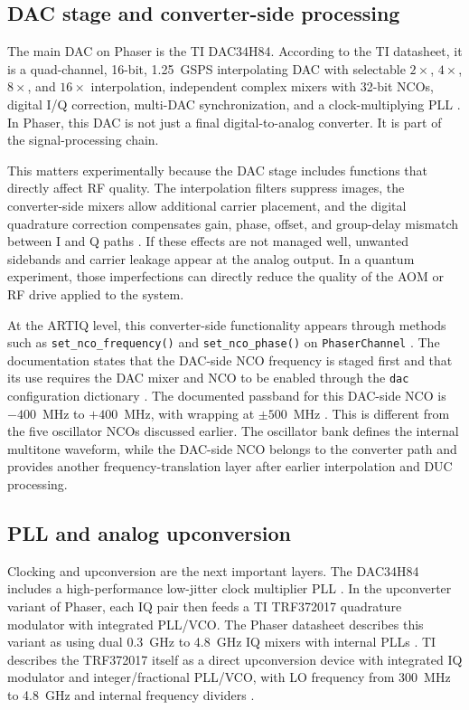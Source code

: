 \subsection{DAC stage and converter-side processing}

The main DAC on Phaser is the TI DAC34H84. According to the TI datasheet, it is a quad-channel, 16-bit, 1.25~GSPS interpolating DAC with selectable \(2\times\), \(4\times\), \(8\times\), and \(16\times\) interpolation, independent complex mixers with 32-bit NCOs, digital I/Q correction, multi-DAC synchronization, and a clock-multiplying PLL \cite{dac34h84}. In Phaser, this DAC is not just a final digital-to-analog converter. It is part of the signal-processing chain.

This matters experimentally because the DAC stage includes functions that directly affect RF quality. The interpolation filters suppress images, the converter-side mixers allow additional carrier placement, and the digital quadrature correction compensates gain, phase, offset, and group-delay mismatch between I and Q paths \cite{dac34h84}. If these effects are not managed well, unwanted sidebands and carrier leakage appear at the analog output. In a quantum experiment, those imperfections can directly reduce the quality of the AOM or RF drive applied to the system.

At the ARTIQ level, this converter-side functionality appears through methods such as \texttt{set\_nco\_frequency()} and \texttt{set\_nco\_phase()} on \texttt{PhaserChannel} \cite{artiq_coredrivers}. The documentation states that the DAC-side NCO frequency is staged first and that its use requires the DAC mixer and NCO to be enabled through the \texttt{dac} configuration dictionary \cite{artiq_coredrivers}. The documented passband for this DAC-side NCO is \(-400\)~MHz to \(+400\)~MHz, with wrapping at \(\pm 500\)~MHz \cite{artiq_coredrivers}. This is different from the five oscillator NCOs discussed earlier. The oscillator bank defines the internal multitone waveform, while the DAC-side NCO belongs to the converter path and provides another frequency-translation layer after earlier interpolation and DUC processing.

\subsection{PLL and analog upconversion}

Clocking and upconversion are the next important layers. The DAC34H84 includes a high-performance low-jitter clock multiplier PLL \cite{dac34h84}. In the upconverter variant of Phaser, each IQ pair then feeds a TI TRF372017 quadrature modulator with integrated PLL/VCO. The Phaser datasheet describes this variant as using dual 0.3~GHz to 4.8~GHz IQ mixers with internal PLLs \cite{phaser_datasheet}. TI describes the TRF372017 itself as a direct upconversion device with integrated IQ modulator and integer/fractional PLL/VCO, with LO frequency from 300~MHz to 4.8~GHz and internal frequency dividers \cite{trf372017}.

